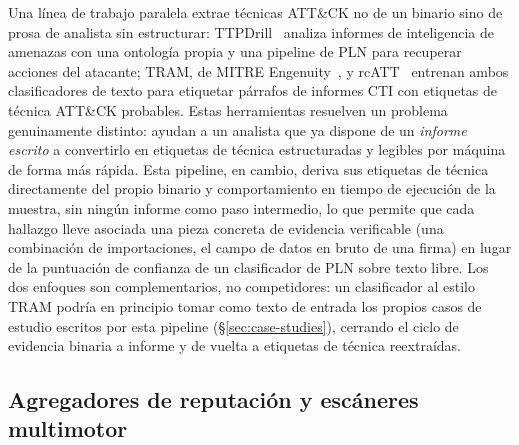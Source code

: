 Una l\'inea de trabajo paralela extrae t\'ecnicas ATT\&CK no de un
binario sino de prosa de analista sin estructurar: TTPDrill~\cite{ttpdrill}
analiza informes de inteligencia de amenazas con una ontolog\'ia
propia y una pipeline de PLN para recuperar acciones del atacante;
TRAM, de MITRE Engenuity~\cite{tram}, y rcATT~\cite{rcatt} entrenan
ambos clasificadores de texto para etiquetar p\'arrafos de informes CTI
con etiquetas de t\'ecnica ATT\&CK probables. Estas herramientas
resuelven un problema genuinamente distinto: ayudan a un analista que
ya dispone de un \emph{informe escrito} a convertirlo en etiquetas de
t\'ecnica estructuradas y legibles por m\'aquina de forma m\'as
r\'apida. Esta pipeline, en cambio, deriva sus etiquetas de t\'ecnica
directamente del propio binario y comportamiento en tiempo de
ejecuci\'on de la muestra, sin ning\'un informe como paso intermedio,
lo que permite que cada hallazgo lleve asociada una pieza concreta de
evidencia verificable (una combinaci\'on de importaciones, el campo de
datos en bruto de una firma) en lugar de la puntuaci\'on de confianza
de un clasificador de PLN sobre texto libre. Los dos enfoques son
complementarios, no competidores: un clasificador al estilo TRAM
podr\'ia en principio tomar como texto de entrada los propios casos de
estudio escritos por esta pipeline (\S\ref{sec:case-studies}), cerrando
el ciclo de evidencia binaria a informe y de vuelta a etiquetas de
t\'ecnica reextra\'idas.

\subsection{Agregadores de reputaci\'on y esc\'aneres multimotor}

